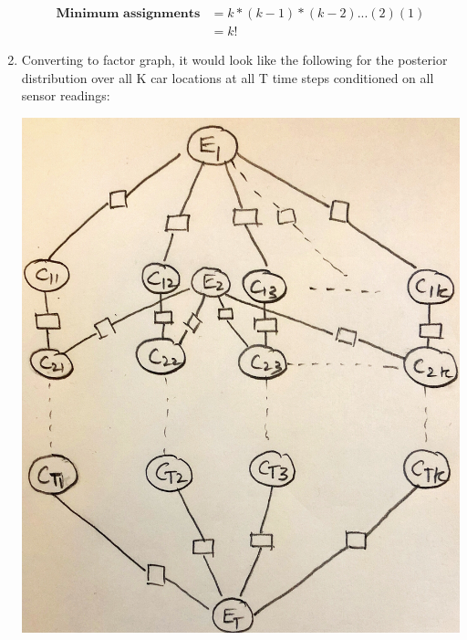 \documentclass[12pt]{article}
\begin{document}
\begin{enumerate}[label=(\alph*)]
  \begin{align*}
  \textbf{Minimum assignments} &= k * (k-1) * (k-2) ... (2) (1) \\
  &= k!
\end{align*}
\item Converting to factor graph, it would look like the following for the posterior distribution over all K car locations at all T time steps conditioned on all sensor readings:
  \begin{center}
  \includegraphics[scale=0.1]{IMG_2298}
  \end{center}
  

\end{enumerate}
\end{document}
